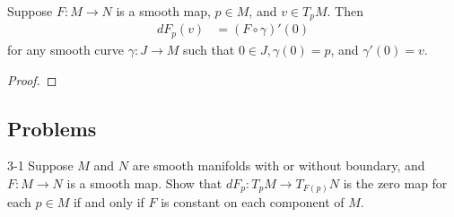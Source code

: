 \begin{customthm}{3.25}
  Suppose $F: M \rightarrow N$ is a smooth map, $p \in M$, and $v \in T_pM$.
  Then
  \begin{align*}
    dF_p(v) &= (F \circ \gamma)'(0)
  \end{align*}
  for any smooth curve $\gamma: J \rightarrow M$ such that $0 \in J, \gamma(0) = p$, and $\gamma'(0) = v$.
\end{customthm}

\begin{proof}
\end{proof}

\subsection{Problems}

\begin{customprob}{3-1}
  Suppose $M$ and $N$ are smooth manifolds with or without boundary, and $F: M \rightarrow N$ is a smooth map.
  Show that $dF_p: T_pM \rightarrow T_{F(p)}N$ is the zero map for each $p \in M$ if and only if $F$ is constant on each component of $M$.
\end{customprob}


